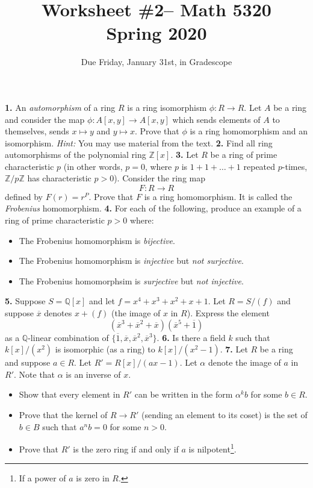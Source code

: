 \documentclass[10pt]{amsart}
\theoremstyle{theorem}
\renewcommand{\to}[1][]{\xrightarrow{\ #1\ }}
\newcommand{\bQ}{\mathbb{Q}}
\newcommand{\bZ}{\mathbb{Z}}
\begin{document}
\title{Worksheet \#2-- Math 5320\\Spring 2020}
\author{Due Friday, January 31st, in Gradescope}

\maketitle


\noindent
{\bf 1.}  An \emph{automorphism} of a ring $R$ is a ring isomorphism $\phi : R \to R$.  Let $A$ be a ring and consider the map $\phi : A[x,y] \to A[x,y]$ which sends elements of $A$ to themselves, sends $x \mapsto y$ and $y \mapsto x$.  Prove that $\phi$ is a ring homomorphism and an isomorphism.  
\vskip 3pt
\emph{Hint:}  You may use material from the text.
\newpage
\noindent
{\bf 2.}  Find all ring automorphisms of the polynomial ring $\mathbb{Z}[x]$.
\newpage
\noindent
{\bf 3.}  Let $R$ be a ring of prime characteristic $p$ (in other words, $p = 0$, where $p$ is $1+1+ \dots + 1$ repeated $p$-times, $\bZ/p\bZ$ has characteristic $p > 0$).  Consider the ring map 
\[
    F : R \to R
\]
defined by $F(r) = r^P$.  Prove that $F$ is a ring homomorphism.  It is called the \emph{Frobenius} homomorphism.
\newpage
\noindent
{\bf 4.}  For each of the following, produce an example of a ring of prime characteristic $p > 0$ where:
\begin{itemize}
    \item[(a)]  The Frobenius homomorphism is \emph{bijective}.
    \item[(b)]  The Frobenius homomorphism is \emph{injective} but \emph{not surjective}.
    \item[(c)]  The Frobenius homomorphsim  is \emph{surjective} but \emph{not injective}.
\end{itemize}
\newpage
\noindent
{\bf 5.}  Suppose $S = \mathbb{Q}[x]$ and let $f = x^4 + x^3 + x^2 + x + 1$.  Let $R = S/(f)$ and suppose $\overline{x}$ denotes $x + (f)$ (the image of $x$ in $R$).  Express the element 
\[
    (\overline{x}^3 + \overline{x}^2 + \overline{x})(\overline{x}^5 + \overline{1})
\]
as a $\bQ$-linear combination of $\{\overline{1}, \overline{x}, \overline{x}^2, \overline{x}^3\}$.  
\newpage
\noindent
{\bf 6.}  Is there a field $k$ such that $k[x]/(x^2)$ is isomorphic (as a ring) to $k[x]/(x^2-1)$.
\newpage
\noindent
{\bf 7.}  Let $R$ be a ring and suppose $a \in R$.  Let $R' = R[x]/(ax - 1)$.  Let $\alpha$ denote the image of $a$ in $R'$.  Note that $\alpha$ is an inverse of $x$.
\begin{itemize}
    \item[(a)]  Show that every element in $R'$ can be written in the form $\alpha^k b$ for some $b \in R$.
    \item[(b)] Prove that the kernel of $R \to R'$ (sending an element to its coset) is the set of $b \in B$ such that $a^n b = 0$ for some $n > 0$.
    \item[(c)] Prove that $R'$ is the zero ring if and only if $a$ is nilpotent\footnote{If a power of $a$ is zero in $R$.}.
\end{itemize}
\end{document}
